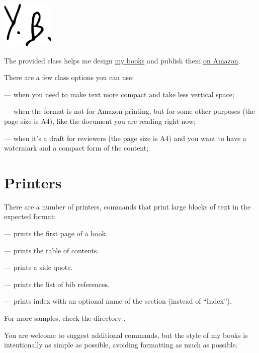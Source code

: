 \documentclass[compact,manuscript]{./yb-book}
\begin{document}
\includegraphics[height=6em]{yb-book-logo.pdf}
\vspace*{24pt}

\maketitle

The provided class  helps me design
\href{https://www.yegor256.com/books.html}{my books} and
publish them
\href{https://www.amazon.com/Yegor-Bugayenko/e/B01AM1QMDK}{on Amazon}.

There are a few class options you can use:

 --- when you need to make text more compact
and take less vertical space;

 --- when the format is not for Amazon printing,
but for some other purposes (the page size is A4), like the document
you are reading right now;

 --- when it's a draft for reviewers (the page size is A4)
and you want to have a watermark and a compact form of the content;

\section*{Printers}

There are a number of printers, commands that print large blocks of text
in the expected format:

 --- prints the first page of a book.

 --- prints the table of contents.

 --- prints a side quote.

 --- prints the list of bib references.

 --- prints index with an optional name of the section (instead of ``Index'').

For more samples, check the directory .

You are welcome to suggest additional commands, but the style
of my books is intentionally as simple as possible, avoiding formatting
as much as possible.
\end{document}
